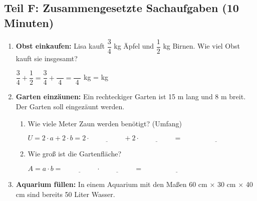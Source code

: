 \subsection*{Teil F: Zusammengesetzte Sachaufgaben (10 Minuten)}

\begin{enumerate}[label=\arabic*.]
    \item \textbf{Obst einkaufen:}
    Lisa kauft $\dfrac{3}{4}$ kg Äpfel und $\dfrac{1}{2}$ kg Birnen. Wie viel Obst kauft sie insgesamt?
    \vspace{0.5cm}

    $\dfrac{3}{4} + \dfrac{1}{2} = \dfrac{3}{4} + \dfrac{\phantom{00}}{4} = \dfrac{\phantom{00}}{4}$ kg = \underline{\hspace{3cm}} kg

    \vspace{1cm}

    \item \textbf{Garten einzäunen:}
    Ein rechteckiger Garten ist 15 m lang und 8 m breit. Der Garten soll eingezäunt werden.
    \vspace{0.5cm}

    \begin{enumerate}[label=\alph*)]
        \item Wie viele Meter Zaun werden benötigt? (Umfang)

        $U = 2 \cdot a + 2 \cdot b = 2 \cdot \underline{\hspace{2cm}} + 2 \cdot \underline{\hspace{2cm}} = \underline{\hspace{4cm}}$

        \vspace{0.5cm}

        \item Wie groß ist die Gartenfläche?

        $A = a \cdot b = \underline{\hspace{2cm}} \cdot \underline{\hspace{2cm}} = \underline{\hspace{4cm}}$
    \end{enumerate}

    \vspace{1cm}

    \item \textbf{Aquarium füllen:}
    In einem Aquarium mit den Maßen 60 cm × 30 cm × 40 cm sind bereits 50 Liter Wasser.
    \vspace{0.5cm}


\end{enumerate}

